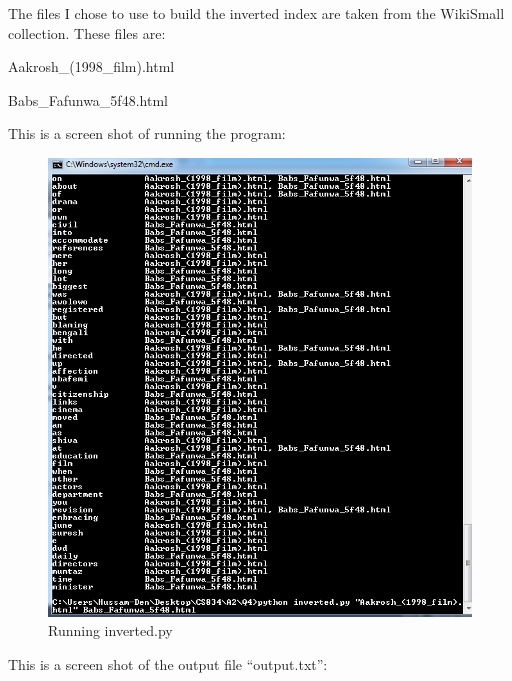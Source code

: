 \documentclass[a4paper, 11pt]{article}
\begin{document}


The files I chose to use to build the inverted index are taken from the WikiSmall collection. These files are:

Aakrosh\_(1998\_film).html

Babs\_Fafunwa\_5f48.html

\pagebreak

This is a screen shot of running the program:


\begin{figure}[h]
\caption{Running inverted.py}
\centering
\includegraphics[scale=0.7]{Q4/inverted.png}
\end{figure}

\pagebreak

This is a screen shot of the output file ``output.txt'':
\end{document}
